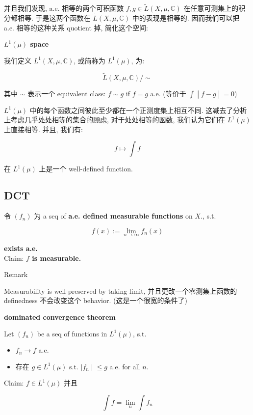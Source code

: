 \documentclass{qlnotes-export}
\begin{document}
并且我们发现, a.e. 相等的两个可积函数 \(f,g \in \widetilde{L}(X,\mu,{\mathbb{C}})\) 在任意可测集上的积分都相等. 于是这两个函数在 \(\widetilde{L}(X,\mu,{\mathbb{C}})\) 中的表现是相等的. 因而我们可以把 a.e. 相等的这种关系 quotient 掉, 简化这个空间:

\begin{definition}{\protect{}\label{kn-l-1-mu-space}{\textbf{\(L^{1}(\mu)\)
space}}}

我们定义 \(L^{1}(X,\mu,{\mathbb{C}})\), 或简称为 \(L^{1}(\mu)\), 为:

\[\widetilde{L}(X,\mu,{\mathbb{C}})/ \sim\]

其中 \(\sim\) 表示一个 equivalent class: \(f \sim g\) if \(f = g\) a.e. (等价于 \(\left. \int \middle| f - g \middle| = 0 \right.\))

\end{definition}

\(L^{1}(\mu)\) 中的每个函数之间彼此至少都在一个正测度集上相互不同. 这减去了分析上考虑几乎处处相等的集合的顾虑, 对于处处相等的函数, 我们认为它们在 \(L^{1}(\mu)\) 上直接相等. 并且, 我们有:

\[f\mapsto\int f\]

在 \(L^{1}(\mu)\) 上是一个 well-defined function.

\subsection{DCT}\label{dct}

\begin{lemma}

令 \((f_{n})\) 为 a seq of \textbf{a.e. defined measurable functions} on \(X\)., s.t.

\[f(x) := \lim\limits_{n\rightarrow\infty}f_{n}(x)\]

\textbf{exists a.e.}\\
Claim: \textbf{\(f\) is measurable.}

\end{lemma}

\begin{qlremark}{Remark}

Measurability is well preserved by taking limit, 并且更改一个零测集上函数的 definedness 不会改变这个 behavior. (这是一个很宽的条件了)

\end{qlremark}

\begin{theorem}{\protect{}\label{kn-dominated-convergence-theorem}{\textbf{dominated
convergence theorem}}}

Let \((f_{n})\) be a seq of functions in \(L^{1}(\mu)\), s.t.

\begin{itemize}
\item
  \(f_{n}\rightarrow f\) a.e.
\item
  存在 \(g \in L^{1}(\mu)\) s.t. \(\left. |f_{n} \middle| \leq g \right.\) a.e. for all \(n\).
\end{itemize}

Claim: \(f \in L^{1}(\mu)\) 并且

\[\int f = \lim\limits_{n}\int f_{n}\]

\end{theorem}
\end{document}
